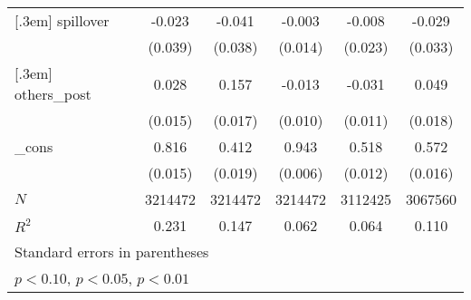 {\begin{tabular}{l*{5}{c}}
[.3em]
spillover &   -0.023         &   -0.041         &   -0.003         &   -0.008         &   -0.029         \\
          &  (0.039)         &  (0.038)         &  (0.014)         &  (0.023)         &  (0.033)         \\



          
[.3em]
others\_post&    0.028\sym{*}  &    0.157\sym{***}&   -0.013         &   -0.031\sym{***}&    0.049\sym{***}\\
          &  (0.015)         &  (0.017)         &  (0.010)         &  (0.011)         &  (0.018)         \\
[.3em]
\_cons    &    0.816\sym{***}&    0.412\sym{***}&    0.943\sym{***}&    0.518\sym{***}&    0.572\sym{***}\\
          &  (0.015)         &  (0.019)         &  (0.006)         &  (0.012)         &  (0.016)         \\
\hline
\(N\)     &  3214472         &  3214472         &  3214472         &  3112425         &  3067560         \\
\(R^{2}\) &    0.231         &    0.147         &    0.062         &    0.064         &    0.110         \\
\hline
\multicolumn{6}{l}{\footnotesize Standard errors in parentheses}\\
\multicolumn{6}{l}{\footnotesize \sym{*} \(p<0.10\), \sym{**} \(p<0.05\), \sym{***} \(p<0.01\)}\\
\end{tabular}
}
